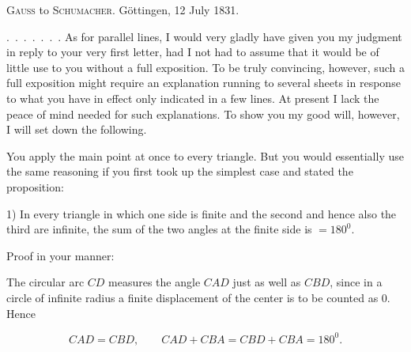 

%
\begin{center}
\textsc{Gauss} to \textsc{Schumacher}. Göttingen, 12 July 1831.
\end{center}

\mbox{.\ .\ .\ .\ .\ .\ .} As for parallel lines, I would very gladly have given you my judgment in reply to your very first letter, had I not had to assume that it would be of little use to you without a full exposition. To be truly convincing, however, such a full exposition might require an explanation running to several sheets
in response to what you have in effect only indicated in a few lines. At present I lack the peace of mind needed for such explanations. To show you my good will, however, I will set down the following.

You apply the main point at once to every triangle. But you would essentially use the same reasoning if you first took up the simplest case and stated the proposition:

1) In every triangle in which one side is finite and the second and hence also the third are infinite, the sum of the two angles at the finite side is $=180^0$.

\begin{center}

\end{center}

Proof in your manner:

The circular arc $CD$ measures the angle $CAD$ just as well as $CBD$, since in a circle of infinite radius a finite displacement of the center is to be counted as $0$. Hence

\[ CAD = CBD, \qquad CAD + CBA = CBD + CBA = 180^0. \]
